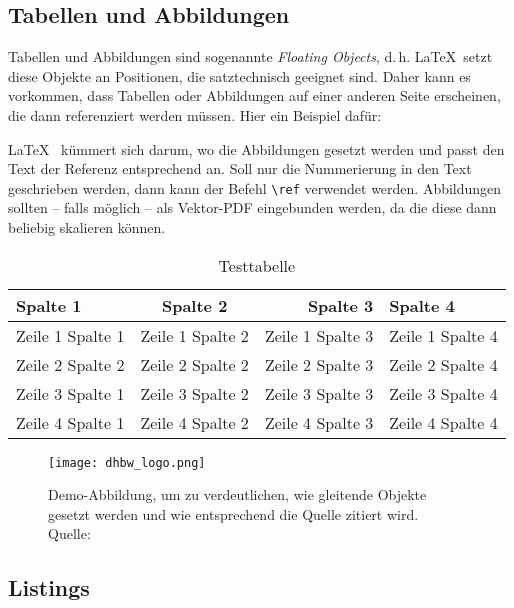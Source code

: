 \subsection{Tabellen und Abbildungen}
Tabellen und Abbildungen sind sogenannte \textit{Floating Objects}, d.\,h. \LaTeX\ setzt diese Objekte an Positionen, die satztechnisch geeignet sind. Daher kann es vorkommen, dass Tabellen oder Abbildungen auf einer anderen Seite erscheinen, die dann referenziert werden müssen. Hier ein Beispiel dafür:

\LaTeX~ kümmert sich darum, wo die Abbildungen gesetzt werden und passt den Text der Referenz entsprechend an. Soll nur die Nummerierung in den Text geschrieben werden, dann kann der Befehl \texttt{\textbackslash ref} verwendet werden. Abbildungen sollten -- falls möglich -- als Vektor-PDF eingebunden werden, da die diese dann beliebig skalieren können.

\lipsum[1]

\begin{table}
	\centering
	\begin{tabular}{p{3cm}crl}
		\textbf{Spalte 1} & \textbf{Spalte 2} & \textbf{Spalte 3} & \textbf{Spalte 4}\\\toprule
		Zeile 1 Spalte 1 &  Zeile 1 Spalte 2 & Zeile 1 Spalte 3 & Zeile 1 Spalte 4\\
		Zeile 2 Spalte 2 &  Zeile 2 Spalte 2 & Zeile 2 Spalte 3 & Zeile 2 Spalte 4\\\midrule
		Zeile 3 Spalte 1 &  Zeile 3 Spalte 2 & Zeile 3 Spalte 3 & Zeile 3 Spalte 4\\
		Zeile 4 Spalte 1 &  Zeile 4 Spalte 2 & Zeile 4 Spalte 3 & Zeile 4 Spalte 4\\\bottomrule
	\end{tabular}
	\caption[Testtabelle]{Testtabelle}
	\label{tab:tabelle1}
\end{table}
\lipsum[1-2]

\begin{figure}
	\centering
	\texttt{[image: dhbw\_logo.png]}
	\captionsetup{format=hang}
	\caption[Optionaler Kurztitel für das Abbildunggsverzeichnis]{Demo-Abbildung, um zu verdeutlichen, wie gleitende Objekte gesetzt werden und wie entsprechend die Quelle zitiert wird. \\Quelle: \cite{imgmj}}
	\label{fig:test}
\end{figure}

\subsection{Listings}

